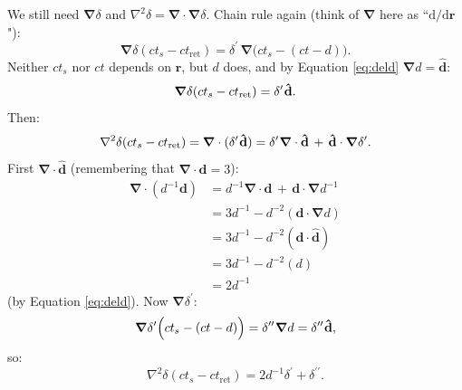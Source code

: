 \documentclass[12pt]{article}
\renewcommand{\vv}[1]{\mathbf{#1}}
\newcommand{\dd}[1]{\mathrm{d}#1}
\newcommand{\del}{\boldsymbol{\nabla}}
\begin{document}
We still need $\del \delta$ and $\nabla^2 \delta = \del \cdot \del \delta$. Chain rule again (think of $\del$ here as ``$\dd / \dd \vv r$"):
\begin{equation*}
\del \delta ( ct_{s} - ct_{\textrm{ret}} ) = \delta^\prime \, \del \Big( ct_{s} - ( ct - d ) \Big) .
\end{equation*}
Neither $ct_{s}$ nor $ct$ depends on $\vv r$, but $d$ does, and by Equation \ref{eq:deld} $\del d = \vv{\hat{d}}$:
\begin{equation}\label{eq:graddelta}
\del \delta ( ct_{s} - ct_{\textrm{ret}} ) = \delta^\prime \mkern1mu \vv{\hat{d}}.
\end{equation}
Then:
\begin{equation*}
\nabla^2 \delta ( ct_{s} - ct_{\textrm{ret}} ) = \del \cdot ( \delta^\prime \mkern1mu \vv{\hat{d}} ) = \delta^{\prime} \mkern1mu \del \cdot \vv{\hat{d}} \, + \, \vv{\hat{d}} \cdot \del \delta^\prime .
\end{equation*}
First $\del \cdot \vv{\hat{d}}$ (remembering that $\del \cdot \vv d = 3$):
\begin{equation*}
\begin{aligned}
\del \cdot (d^{-1} \vv d) &= d^{-1} \del \cdot \vv d \, + \, \vv d \cdot \del d^{-1} \\
&= 3 d^{-1} - d^{-2} (\vv d \cdot \del d) \\
&= 3 d^{-1} - d^{-2} (\vv d \cdot \vv{\hat{d}}) \\
&= 3 d^{-1} - d^{-2} (d) \\
&= 2 d^{-1}
\end{aligned}
\end{equation*}
(by Equation \ref{eq:deld}). Now $\del \delta^\prime$:
\begin{equation*}
\del \delta^\prime \Big( ct_{s} - ( ct - d ) \Big) = \delta^{\prime \prime} \mkern1mu \del d = \delta^{\prime \prime} \mkern1mu \vv{\hat{d}} ,
\end{equation*}
so:
\begin{equation}\label{eq:lapdelta}
\nabla^2 \delta ( ct_{s} - ct_{\textrm{ret}} ) = 2 d^{-1} \delta^\prime + \delta^{\prime \prime}.
\end{equation}
\end{document}
